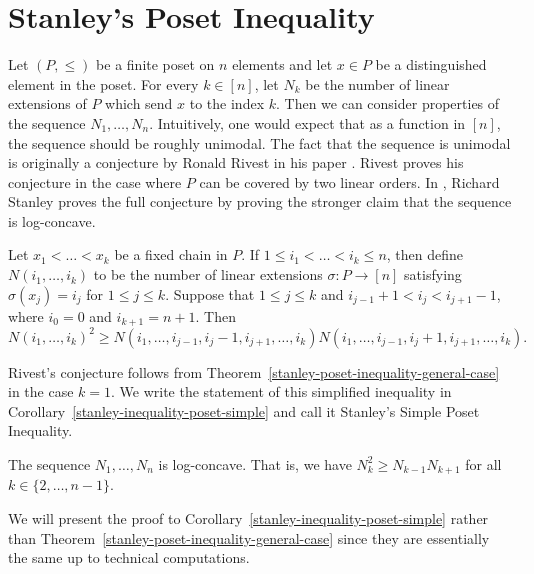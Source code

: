 \documentclass{puthesis-UG}
\begin{document}
\section{Stanley's Poset Inequality} \label{stanley-poset-inequality}

Let $(P, \leq)$ be a finite poset on $n$ elements and let $x \in P$ be a distinguished element in the poset. For every $k \in [n]$, let $N_k$ be the number of linear extensions of $P$ which send $x$ to the index $k$. Then we can consider properties of the sequence $N_1, \ldots, N_n$. Intuitively, one would expect that as a function in $[n]$, the sequence should be roughly unimodal. The fact that the sequence is unimodal is originally a conjecture by Ronald Rivest in his paper \cite{stanley-poset-inequality-origin}. Rivest proves his conjecture in the case where $P$ can be covered by two linear orders. In \cite{STANLEY}, Richard Stanley proves the full conjecture by proving the stronger claim that the sequence is log-concave.

\begin{thm} \label{stanley-poset-inequality-general-case}
	Let $x_1 < \ldots < x_k$ be a fixed chain in $P$. If $1 \leq i_1 < \ldots < i_k \leq n$, then define $N(i_1, \ldots, i_k)$ to be the number of linear extensions $\sigma : P \to [n]$ satisfying $\sigma (x_j) = i_j$ for $1 \leq j \leq k$. Suppose that $1 \leq j \leq k$ and $i_{j-1} + 1 < i_j < i_{j+1} - 1$, where $i_0 = 0$ and $i_{k+1} = n+1$. Then 
	\[
		N(i_1, \ldots, i_k)^2 \geq N(i_1, \ldots, i_{j-1}, i_j - 1, i_{j+1}, \ldots, i_k) N(i_1, \ldots, i_{j-1}, i_j + 1, i_{j+1}, \ldots, i_k).
	\]
\end{thm}

Rivest's conjecture follows from Theorem~\ref{stanley-poset-inequality-general-case} in the case $k = 1$. We write the statement of this simplified inequality in Corollary~\ref{stanley-inequality-poset-simple} and call it Stanley's Simple Poset Inequality.

\begin{cor} \label{stanley-inequality-poset-simple}
	The sequence $N_1, \ldots, N_n$ is log-concave. That is, we have $N_k^2 \geq N_{k-1}N_{k+1}$ for all $k \in \{2, \ldots, n-1\}.$
\end{cor}

We will present the proof to Corollary~\ref{stanley-inequality-poset-simple} rather than Theorem~\ref{stanley-poset-inequality-general-case} since they are essentially the same up to technical computations.
\end{document}
